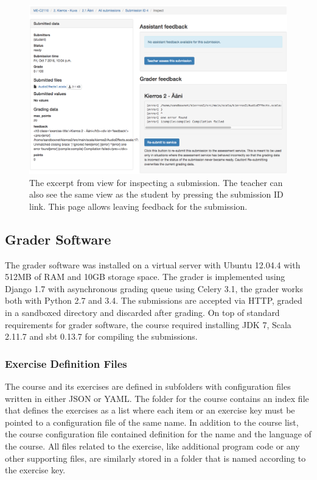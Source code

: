 \begin{figure}[!t]
	\begin{center}
		\includegraphics[width=\textwidth]{images/inspect-submission.png}
	\end{center}
	\caption[asdf]{\small{The excerpt from view for inspecting a submission. The teacher can also see the same view as the student by pressing the submission ID link. This page allows leaving feedback for the submission.}}
	\label{figure:inspect-submission}
\end{figure}


\subsection{Grader Software}
\label{subsection:grader}

The grader software was installed on a virtual server with Ubuntu 12.04.4 with 512MB of RAM and 10GB storage space. The grader is implemented using Django 1.7 with asynchronous grading queue using Celery 3.1, the grader works both with Python 2.7 and 3.4. The submissions are accepted via HTTP, graded in a sandboxed directory and discarded after grading. On top of standard requirements for grader software, the course required installing JDK 7, Scala 2.11.7 and sbt 0.13.7 for compiling the submissions.


\subsubsection*{Exercise Definition Files}

The course and its exercises are defined in subfolders with configuration files written in either JSON or YAML. The folder for the course contains an index file that defines the exercises as a list where each item or an exercise key must be pointed to a configuration file of the same name. In addition to the course list, the course configuration file contained definition for the name and the language of the course. All files related to the exercise, like additional program code or any other supporting files, are similarly stored in a folder that is named according to the exercise key.

